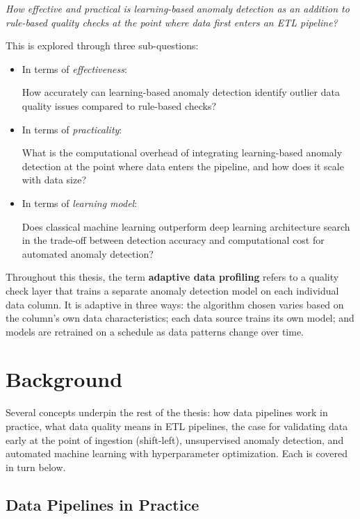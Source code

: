 \documentclass[12pt]{article}
\begin{document}
\begin{center}
\emph{How effective and practical is learning-based anomaly detection as an addition to rule-based quality checks at the point where data first enters an ETL pipeline?}
\end{center}

This is explored through three sub-questions:

\begin{itemize}
  \item In terms of \emph{effectiveness}: 
  
  How accurately can learning-based anomaly detection identify outlier data quality issues compared to rule-based checks?
  \item In terms of \emph{practicality}:

  What is the computational overhead of integrating learning-based anomaly detection at the point where data enters the pipeline, and how does it scale with data size?
  \item In terms of \emph{learning model}:
  
  Does classical machine learning outperform deep learning architecture search in the trade-off between detection accuracy and computational cost for automated anomaly detection?
\end{itemize}

Throughout this thesis, the term \textbf{adaptive data profiling} refers to a quality check layer that trains a separate anomaly detection model on each individual data column. It is adaptive in three ways: the algorithm chosen varies based on the column's own data characteristics; each data source trains its own model; and models are retrained on a schedule as data patterns change over time.

\section{Background}\label{sec:background}

Several concepts underpin the rest of the thesis: how data pipelines work in practice, what data quality means in ETL pipelines, the case for validating data early at the point of ingestion (shift-left), unsupervised anomaly detection, and automated machine learning with hyperparameter optimization. Each is covered in turn below.

\subsection{Data Pipelines in Practice}
\end{document}
